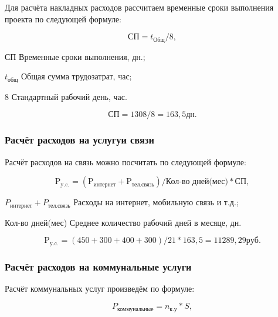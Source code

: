 Для расчёта накладных расходов рассчитаем временные сроки выполнения проекта по следующей
формуле:

\begin{equation}
    \text{СП} = t_\text{Общ} / 8,
\end{equation}

\begin{eqexpl}[25mm]
    \item{СП} Временные сроки выполнения, дн.;
    \item{$t_\text{общ}$} Общая сумма трудозатрат, час;
    \item{8} Стандартный рабочий день, час.
\end{eqexpl}

\begin{equation*}
    \text{СП} = 1308 / 8 = 163,5 дн.
\end{equation*}

\subsubsection{Расчёт расходов на услугуи связи}

Расчёт расходов на связь можно посчитать по следующей формуле:

\begin{equation}
    \text{P}_\text{y.c.} = (\text{P}_\text{интернет} + \text{P}_\text{тел.связь}) / \text{Кол-во дней(мес)} * \text{СП},
\end{equation}

\begin{eqexpl}[57mm]
    \item{$P_\text{интернет} + P_\text{тел.связь}$} Расходы на интернет, мобильную связь и т.д.;
    \item{Кол-во дней(мес)} Среднее количество рабочий дней в месяце, дн.
\end{eqexpl}

\begin{equation*}
    \text{P}_\text{y.c.} = (450 + 300 + 400 + 300) / 21 * 163,5 = 11289,29 руб.
\end{equation*}

\subsubsection{Расчёт расходов на коммунальные услуги}

Расчёт коммунальных услуг произведём по формуле:

\begin{equation}
    P_\text{коммунальные} = n_\text{к.у} * S,
\end{equation}


